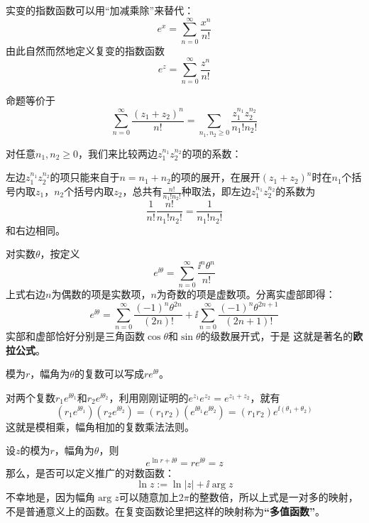 \documentclass[CJK]{beamer}
\begin{document}
\begin{frame}
  \bch
  实变的指数函数可以用“加减乘除”来替代：
  $$ e^x  = \sum_{n=0}^{\infty} \frac{x^n}{n!}$$
  由此自然而然地定义复变的指数函数
  $$ e^z = \sum_{n=0}^{\infty} \frac{z^n}{n!}$$
  \ech
\end{frame}


\begin{frame}
  \bch
  命题等价于
  $$\sum_{n=0}^\infty \frac{(z_1+z_2)^n}{n!} = \sum_{n_1, n_2\ge 0}\frac{z_1^{n_1}z_2^{n_2}}{n_1!n_2!}$$

  对任意$n_1,n_2\ge0$，我们来比较两边$z_1^{n_1}z_2^{n_2}$的项的系数：
  
  左边$z_1^{n_1}z_2^{n_2}$的项只能来自于$n=n_1+n_2$的项的展开，在展开$(z_1+z_2)^n$时在$n_1$个括号内取$z_1$，$n_2$个括号内取$z_2$，总共有$\frac{n!}{n_1!n_2!}$种取法，即左边$z_1^{n_1}z_2^{n_2}$的系数为
  $$\frac{1}{n!} \frac{n!}{n_1!n_2!} = \frac{1}{n_1!n_2!}$$
  和右边相同。
  \ech
\end{frame}

\begin{frame}
  \bch
  对实数$\theta$，按定义
  $$e^{\ii\theta} = \sum_{n=0}^\infty \frac{\ii^n\theta^n}{n!} $$
  上式右边$n$为偶数的项是实数项，$n$为奇数的项是虚数项。分离实虚部即得：
  $$e^{\ii\theta} = \sum_{n=0}^\infty \frac{(-1)^n\theta^{2n}}{(2n)!} + \ii  \sum_{n=0}^\infty \frac{(-1)^n\theta^{2n+1}}{(2n+1)!}$$
  实部和虚部恰好分别是三角函数$\cos\theta$和$\sin\theta$的级数展开式，于是
  这就是著名的{\bf\blue 欧拉公式}。
  \ech
\end{frame}

\begin{frame}
  \bch
      {\blue 模为$r$，幅角为$\theta$的复数可以写成$re^{\ii\theta}$。}
      
  对两个复数$r_1e^{\ii \theta_1}$和$r_2e^{\ii\theta_2}$，利用刚刚证明的$e^{z_1}e^{z_2} =e^{z_1+z_2}$，就有
  $$\left(r_1e^{\ii \theta_1}\right)\left(r_2e^{\ii\theta_2}\right) = (r_1r_2)\left(e^{\ii\theta_1}e^{\ii\theta_2}\right)= (r_1r_2)e^{\ii(\theta_1+\theta_2)}$$
      这就是模相乘，幅角相加的复数乘法法则。  
  
  \ech
\end{frame}

\begin{frame}
  \bch
  设$z$的模为$r$，幅角为$\theta$，则 
  $$e^{\ln r + \ii \theta} = r e^{\ii\theta} = z$$
  那么，是否可以定义推广的对数函数：
  $$\ln z := \ln |z| + \ii \arg z$$
  不幸地是，因为幅角$\arg z$可以随意加上$2\pi$的整数倍，所以上式是一对多的映射，不是普通意义上的函数。在复变函数论里把这样的映射称为{\bf ``多值函数''}。
  \ech
\end{frame}
\end{document}
